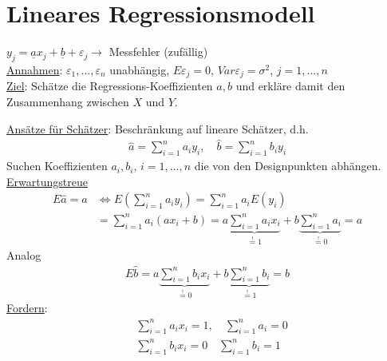 \documentclass[a4paper,openany]{book}
\theoremstyle{mytheoremstyle}
\theoremstyle{mytheoremstyle2}
\begin{document}
\section*{Lineares Regressionsmodell}
$y_j=\underline{a}x_j+\underline{b}+\varepsilon _j\to$ Messfehler (zufällig) \\
\underline{Annahmen}: $\varepsilon _1,...,\varepsilon _n$ unabhängig, $E \varepsilon _j=0$, $Var \varepsilon _j=\sigma ^2$, $j=1,...,n$ \\
\underline{Ziel}: Schätze die Regressions-Koeffizienten $a,b$ und erkläre damit den Zusammenhang zwischen $X$ und $Y$.  
\begin{center}
\end{center}
\underline{Ansätze für Schätzer}: Beschränkung auf lineare Schätzer, d.h. 
\begin{align*}
  \hat{a}=\sum_{i=1}^{n}{a_iy_i},\quad \hat{b}=\sum_{i=1}^{n}{b_iy_i}
\end{align*}
Suchen Koeffizienten $a_i,b_i$, $i=1,...,n$ die von den Designpunkten abhängen.  \\
\underline{Erwartungstreue}
\begin{align*}
  E \hat{a}
  =a &\Leftrightarrow E\left(\sum_{i=1}^{n}{a_iy_i}\right)=\sum_{i=1}^{n}{a_iE(y_i)} \\
  &=\sum_{i=1}^{n}{a_i(ax_i+b)}=a \underbrace{\sum_{i=1}^{n}{a_ix_i}}_{\overset{!}=1}+b \underbrace{\sum_{i=1}^{n}{a_i}}_{\overset{!}=0}=a
\end{align*}
Analog
\begin{align*}
  E \hat{b}=a \underbrace{\sum_{i=1}^{n}{b_ix_i}}_{\overset{!}=0}+b \underbrace{\sum_{i=1}^{n}{b_i}}_{\overset{!}=1}=b
\end{align*}
\underline{Fordern}: 
\begin{align*}
  &\sum_{i=1}^{n}{a_ix_i}=1, \quad \sum_{i=1}^{n}{a_i}=0 \\
  &\sum_{i=1}^{n}{b_ix_i}=0\quad \sum_{i=1}^{n}{b_i}=1
\end{align*}
\end{document}
